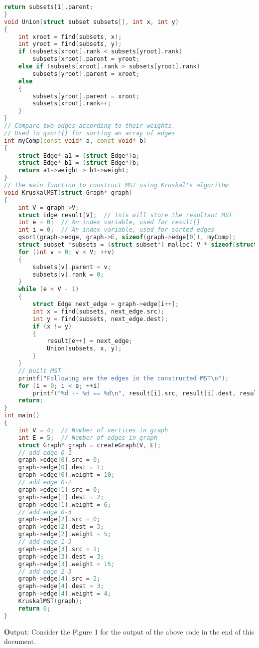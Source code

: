 \documentclass[11pt]{article}            %
\begin{document}
\begin{lstlisting}[language=C++]
    return subsets[i].parent;
}
void Union(struct subset subsets[], int x, int y)
{
    int xroot = find(subsets, x);
    int yroot = find(subsets, y);
    if (subsets[xroot].rank < subsets[yroot].rank)
        subsets[xroot].parent = yroot;
    else if (subsets[xroot].rank > subsets[yroot].rank)
        subsets[yroot].parent = xroot;
    else
    {
        subsets[yroot].parent = xroot;
        subsets[xroot].rank++;
    }
}
// Compare two edges according to their weights.
// Used in qsort() for sorting an array of edges
int myComp(const void* a, const void* b)
{
    struct Edge* a1 = (struct Edge*)a;
    struct Edge* b1 = (struct Edge*)b;
    return a1->weight > b1->weight;
}
// The main function to construct MST using Kruskal's algorithm
void KruskalMST(struct Graph* graph)
{
    int V = graph->V;
    struct Edge result[V];  // Tnis will store the resultant MST
    int e = 0;  // An index variable, used for result[]
    int i = 0;  // An index variable, used for sorted edges
    qsort(graph->edge, graph->E, sizeof(graph->edge[0]), myComp);
    struct subset *subsets = (struct subset*) malloc( V * sizeof(struct subset) );
    for (int v = 0; v < V; ++v)
    {
        subsets[v].parent = v;
        subsets[v].rank = 0;
    }
    while (e < V - 1)
    {
        struct Edge next_edge = graph->edge[i++];
        int x = find(subsets, next_edge.src);
        int y = find(subsets, next_edge.dest);
        if (x != y)
        {
            result[e++] = next_edge;
            Union(subsets, x, y);
        }
    }
    // built MST
    printf("Following are the edges in the constructed MST\n");
    for (i = 0; i < e; ++i)
        printf("%d -- %d == %d\n", result[i].src, result[i].dest, result[i].weight);
    return;
}
int main()
{
    int V = 4;  // Number of vertices in graph
    int E = 5;  // Number of edges in graph
    struct Graph* graph = createGraph(V, E);
    // add edge 0-1
    graph->edge[0].src = 0;
    graph->edge[0].dest = 1;
    graph->edge[0].weight = 10;
    // add edge 0-2
    graph->edge[1].src = 0;
    graph->edge[1].dest = 2;
    graph->edge[1].weight = 6;
    // add edge 0-3
    graph->edge[2].src = 0;
    graph->edge[2].dest = 3;
    graph->edge[2].weight = 5;
    // add edge 1-3
    graph->edge[3].src = 1;
    graph->edge[3].dest = 3;
    graph->edge[3].weight = 15;
    // add edge 2-3
    graph->edge[4].src = 2;
    graph->edge[4].dest = 3;
    graph->edge[4].weight = 4;
    KruskalMST(graph);
    return 0;
}
\end{lstlisting}
 \textbf Output: Consider the Figure 1 for the output of the above code in the end of this document.
\end{document}
